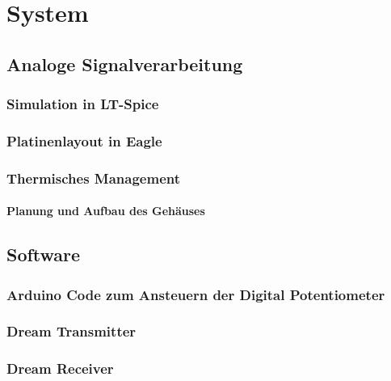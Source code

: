 
\chapter{System}
\label{sec:system}

\section{Analoge Signalverarbeitung}
\label{sec:Signalverarbeitung}


\subsection{Simulation in LT-Spice}
\label{subsec:Unterabschnitt1}
 
\subsection{Platinenlayout in Eagle}
\label{subsec:Unterabschnitt12}

\subsection{Thermisches Management}
\label{subsub:Unterunterabschnitt1}

\subsubsection{Planung und Aufbau des Gehäuses}
\label{subsec:Unterabschnitt12}


\section{Software}
\label{sec:Software}
\subsection{Arduino Code zum Ansteuern der Digital Potentiometer}
\label{subsec:Unterabschnitt12}



\subsection{Dream Transmitter}
\label{subsec:Unterabschnitt12}

\subsection{Dream Receiver}
\label{subsec:Unterabschnitt12}

